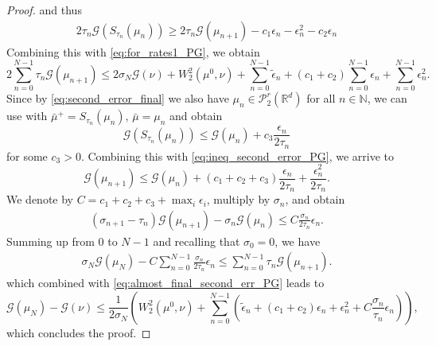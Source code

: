 \documentclass[10pt,a4paper]{amsart}
\newcommand{\N}{\mathbb{N}}
\newcommand{\R}{\mathbb{R}}
\newcommand{\cG}{\mathcal{G}}
\newcommand{\cP}{\mathcal{P}}
\newcommand{\cT}{S}
\begin{document}
\begin{proof}
	and thus
	\begin{equation}\label{eq:ineq_second_error_PG}
		\begin{aligned}
			2\tau_n\mathcal{G}(\cT_{\tau_{n}}( \mu_{n})) \geq 2\tau_n\mathcal{G}(\mu_{n+1}) - c_1\epsilon_n - \epsilon_n^2 - c_2 \epsilon_n
		\end{aligned}
	\end{equation}
	Combining this with \eqref{eq:for_rates1_PG}, we obtain
	\begin{equation}\label{eq:almost_final_second_err_PG}
		2\sum_{n=0}^{N-1}\tau_n\cG(\mu_{n+1})\leq 2\sigma_N \cG(\nu)+W_2^2(\mu^0,\nu)+\sum_{n=0}^{N-1}\tilde{\epsilon}_n+(c_1+c_2)\sum_{n=0}^{N-1}\epsilon_n + \sum_{n=0}^{N-1}\epsilon_n^2.
	\end{equation}
	Since by \eqref{eq:second_error_final} we also have $\mu_n\in \cP_2^r(\R^d)$ for all $n\in \N$, we can use  with $\bar \mu^+=\cT_{\tau_{n}}( \mu_{n})$, $\bar \mu = \mu_n$ and obtain
	\begin{equation}
		\mathcal{G}(\cT_{\tau_{n}}( \mu_{n})) \leq \mathcal{G}(\mu_n) + c_3\frac{\epsilon_n}{2\tau_n}
	\end{equation}
	for some $c_3 > 0$. Combining this with \eqref{eq:ineq_second_error_PG}, we arrive to
	\begin{equation*}
		\mathcal{G}(\mu_{n+1}) \leq \mathcal{G}(\mu_n) + (c_1+c_2+c_3)\frac{\epsilon_n}{2\tau_n} + \frac{\epsilon_n^2}{2\tau_n}.
	\end{equation*}
	We denote by $C = c_1+c_2+c_3+\max_i \epsilon_i$, multiply by $\sigma_n$, and obtain
	\begin{equation}
		\begin{aligned}
			(\sigma_{n+1}-\tau_n)\cG(\mu_{n+1}) - \sigma_{n}\cG(\mu_n) \leq C\frac{\sigma_n}{2\tau_n}\epsilon_n.
		\end{aligned}
	\end{equation}
	Summing up from $0$ to $N-1$ and recalling that $\sigma_0=0$, we have
	\begin{equation}
		\begin{aligned}
			\sigma_{N}\cG(\mu_N) - C \sum_{n=0}^{N-1}\frac{\sigma_n}{2\tau_n}\epsilon_{n} \leq \sum_{n=0}^{N-1}\tau_n \cG(\mu_{n+1}).
		\end{aligned}
	\end{equation}
	which combined with \eqref{eq:almost_final_second_err_PG} leads to
	\begin{equation*}
		\cG(\mu_{N}) - \cG(\nu) \leq \frac{1}{2\sigma_N}\left(W_2^2(\mu^0,\nu)+\sum_{n=0}^{N-1}\left(\tilde{\epsilon}_n+(c_1+c_2)\epsilon_n + \epsilon_n^2+C\frac{\sigma_n}{\tau_n}\epsilon_{n}\right)\right),
	\end{equation*}
	which concludes the proof.
\end{proof}
\end{document}
